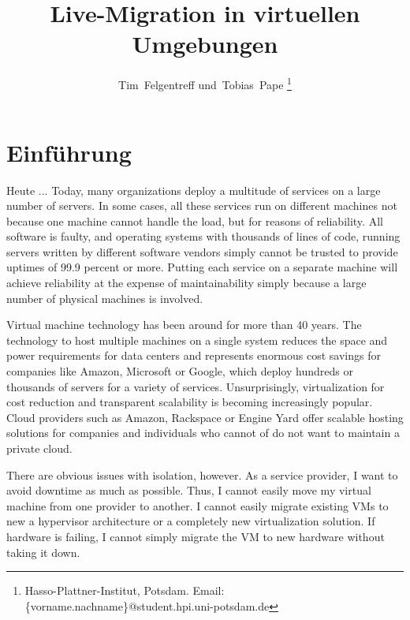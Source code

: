 \documentclass[a4paper,conference,compsoc]{IEEEtran}
\title{Live-Migration in virtuellen Umgebungen}
\author{\IEEEauthorblockN{Tim Felgentreff und Tobias Pape}
  \IEEEauthorblockA{Hasso-Plattner-Institut\\
    Potsdam, Germany\\
    Email: \{vorname.nachname\}@student.hpi.uni-potsdam.de}%
}
\author{Tim~Felgentreff und~Tobias~Pape%
\thanks{%
  Hasso-Plattner-Institut, Potsdam.\goodbreak
  Email: \{vorname.nachname\}@student.hpi.uni-potsdam.de}%
}
\begin{document}
\maketitle

\begin{abstract}
  
\end{abstract}

\IEEEpeerreviewmaketitle


\section{Einführung}
\label{sec:einfuehrung}
Heute ...
Today, many organizations deploy a multitude of services on a large
number of servers. In some cases, all these services run on different
machines not because one machine cannot handle the load, but for
reasons of reliability.  All software is faulty\cite{zellerprograms},
and operating systems with thousands of lines of code, running servers
written by different software vendors simply cannot be trusted to
provide uptimes of 99.9 percent or more. Putting each service on a
separate machine will achieve reliability at the expense of
maintainability simply because a large number of physical machines is
involved.

Virtual machine technology has been around for more than 40
years\cite{tanenbaum1992modern}. The technology to host multiple
machines on a single system reduces the space and power requirements
for data centers and represents enormous cost savings for companies
like Amazon, Microsoft or Google, which deploy hundreds or thousands
of servers for a variety of services. Unsurprisingly, virtualization
for cost reduction and transparent scalability is becoming
increasingly popular. Cloud providers such as Amazon, Rackspace or
Engine Yard offer scalable hosting solutions for companies and
individuals who cannot of do not want to maintain a private cloud.

There are obvious issues with isolation, however. As a service
provider, I want to avoid downtime as much as possible. Thus, I cannot
easily move my virtual machine from one provider to another. I cannot
easily migrate existing VMs to new a hypervisor architecture or a
completely new virtualization solution. If hardware is failing, I
cannot simply migrate the VM to new hardware without taking it down.
\end{document}

